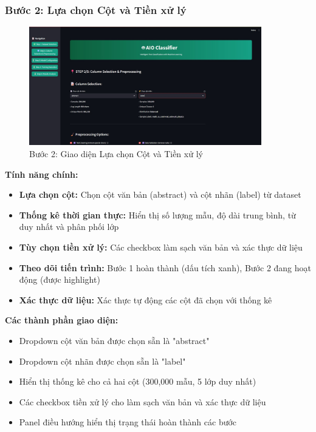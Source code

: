 \subsubsection{Bước 2: Lựa chọn Cột và Tiền xử lý}

\begin{figure}[H]
    \centering
    \includegraphics[width=0.9\textwidth]{image/Step 2.jpg}
    \caption{Bước 2: Giao diện Lựa chọn Cột và Tiền xử lý}
    \label{fig:step2}
\end{figure}

\textbf{Tính năng chính:}
\begin{itemize}
    \item \textbf{Lựa chọn cột:} Chọn cột văn bản (abstract) và cột nhãn (label) từ dataset
    \item \textbf{Thống kê thời gian thực:} Hiển thị số lượng mẫu, độ dài trung bình, từ duy nhất và phân phối lớp
    \item \textbf{Tùy chọn tiền xử lý:} Các checkbox làm sạch văn bản và xác thực dữ liệu
    \item \textbf{Theo dõi tiến trình:} Bước 1 hoàn thành (dấu tích xanh), Bước 2 đang hoạt động (được highlight)
    \item \textbf{Xác thực dữ liệu:} Xác thực tự động các cột đã chọn với thống kê
\end{itemize}

\textbf{Các thành phần giao diện:}
\begin{itemize}
    \item Dropdown cột văn bản được chọn sẵn là "abstract"
    \item Dropdown cột nhãn được chọn sẵn là "label"
    \item Hiển thị thống kê cho cả hai cột (300,000 mẫu, 5 lớp duy nhất)
    \item Các checkbox tiền xử lý cho làm sạch văn bản và xác thực dữ liệu
    \item Panel điều hướng hiển thị trạng thái hoàn thành các bước
\end{itemize}

